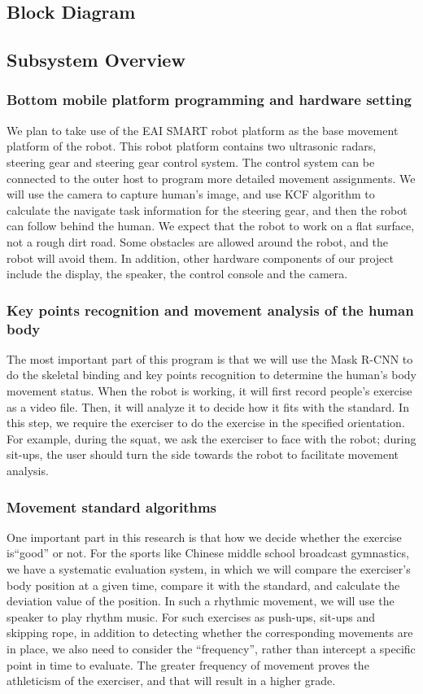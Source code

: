 \subsection{Block Diagram}


\subsection{Subsystem Overview}
\subsubsection{Bottom mobile platform programming and hardware setting}
We plan to take use of the EAI SMART robot platform as the base movement platform of the robot. This robot platform contains two ultrasonic radars, steering gear and steering gear control system. The control system can be connected to the outer host to program more detailed movement assignments. We will use the camera to capture human’s image, and use KCF algorithm to calculate the navigate task information for the steering gear, and then the robot can follow behind the human. We expect that the robot to work on a flat surface, not a rough dirt road. Some obstacles are allowed around the robot, and the robot will avoid them. In addition, other hardware components of our project include the display, the speaker, the control console and the camera. 

\subsubsection{Key points recognition and movement analysis of the human body}
The most important part of this program is that we will use the Mask R-CNN to do the skeletal binding and key points recognition to determine the human's body movement status. When the robot is working, it will first record people’s exercise as a video file. Then, it will analyze it to decide how it fits with the standard. In this step, we require the exerciser to do the exercise in the specified orientation. For example, during the squat, we ask the exerciser to face with the robot; during sit-ups, the user should turn the side towards the robot to facilitate movement analysis.

\subsubsection{Movement standard algorithms}
One important part in this research is that how we decide whether the exercise is``good” or not. For the sports like Chinese middle school broadcast gymnastics, we have a systematic evaluation system, in which we will compare the exerciser’s body position at a given time, compare it with the standard, and calculate the deviation value of the position. In such a rhythmic movement, we will use the speaker to play rhythm music. For such exercises as push-ups, sit-ups and skipping rope, in addition to detecting whether the corresponding movements are in place, we also need to consider the ``frequency”, rather than intercept a specific point in time to evaluate. The greater frequency of movement proves the athleticism of the exerciser, and that will result in a higher grade. 

